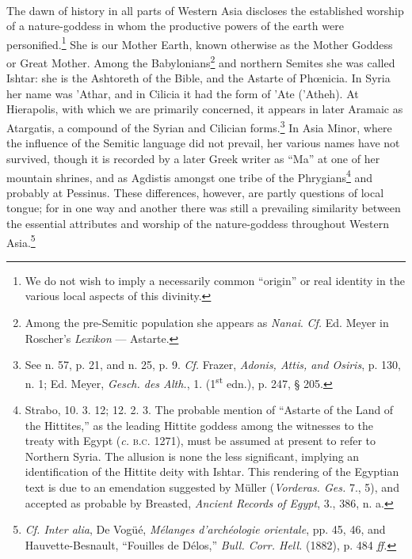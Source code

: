 \documentclass[a4paper, 11pt, oneside, polutonikogreek, english]{article}
\begin{document}
\paragraph{}
The dawn of history in all parts of Western Asia discloses the established worship of a nature-goddess in whom the productive powers of the earth were personified.\footnote{We do not wish to imply a necessarily common ``origin'' or real identity in the various local aspects of this divinity.} She is our Mother Earth, known otherwise as the Mother Goddess or Great Mother. Among the Babylonians\footnote{Among the pre-Semitic population she appears as \emph{Nanai}. \emph{Cf.} Ed. Meyer in Roscher's \emph{Lexikon} --- Astarte.} and northern Semites she was called Ishtar: she is the Ashtoreth of the Bible, and the Astarte of Phœnicia. In Syria her name was 'Athar, and in Cilicia it had the form of 'Ate ('Atheh). At Hierapolis, with which we are primarily concerned, it appears in later Aramaic as Atargatis, a compound of the Syrian and Cilician forms.\footnote{See n. 57, p. 21, and n. 25, p. 9. \emph{Cf.} Frazer, \emph{Adonis, Attis, and Osiris}, p. 130, n. 1; Ed. Meyer, \emph{Gesch. des Alth.}, 1. (1\textsuperscript{st} edn.), p. 247, § 205.} In Asia Minor, where the influence of the Semitic language did not prevail, her various names have not survived, though it is recorded by a later Greek writer as ``Ma'' at one of her mountain shrines, and as Agdistis amongst one tribe of the Phrygians\footnote{Strabo, 10. 3. 12; 12. 2. 3.  The probable mention of ``Astarte of the Land of the Hittites,'' as the leading Hittite goddess among the witnesses to the treaty with Egypt (\emph{c.} \textsc{b.c.} 1271), must be assumed at present to refer to Northern Syria. The allusion is none the less significant, implying an identification of the Hittite deity with Ishtar. This rendering of the Egyptian text is due to an emendation suggested by Müller (\emph{Vorderas. Ges.} 7., 5), and accepted as probable by Breasted, \emph{Ancient Records of Egypt}, 3., 386, n. a.} and probably at Pessinus. These differences, however, are partly questions of local tongue; for in one way and another there was still a prevailing similarity between the essential attributes and worship of the nature-goddess throughout Western Asia.\footnote{\emph{Cf. Inter alia}, De Vogüé, \emph{Mélanges d'archéologie orientale}, pp. 45, 46, and Hauvette-Besnault, ``Fouilles de Délos,'' \emph{Bull. Corr. Hell.} (1882), p. 484 \emph{ff.}}
\end{document}
